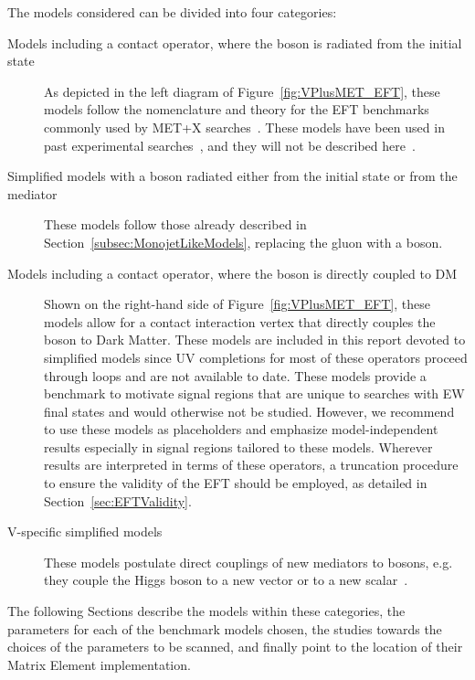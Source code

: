 %
The models considered can be divided into four categories:
\begin{description}
 \item[Models including a contact operator, where the boson is radiated from the initial state] As depicted in
 the left diagram of Figure~\ref{fig:VPlusMET_EFT}, these models follow the nomenclature and theory
 for the EFT benchmarks commonly used by MET+X searches~\cite{Goodman:2010ku}. These models
 have been used in past experimental searches~\cite{Khachatryan:2014rwa, Aad:2014vka,Khachatryan:2014tva, Aad:2014vka,
 ATLAS:2014wra, Aad:2013oja}, and they will not be described here~\cite{Cotta:2012nj, Carpenter:2012rg, Crivellin:2015wva,Berlin:2014cfa}.
 \item[Simplified models with a boson radiated either from the initial state or from the mediator] These models follow those
 already described in Section~\ref{subsec:MonojetLikeModels}, replacing the gluon with a boson.
 \item[Models including a contact operator, where the boson is directly coupled to DM]
 Shown on the right-hand side of Figure~\ref{fig:VPlusMET_EFT},
 these models allow for a contact interaction vertex that directly couples the boson to Dark Matter.
 These models are included in this report devoted to simplified models since 
 UV completions for most of these operators proceed through loops and are not available to date. 
 These models provide a benchmark to motivate signal regions that are unique to searches with
 EW final states and would otherwise not be studied. However, we recommend to use these models
 as placeholders and emphasize model-independent results especially in signal regions tailored to these models. 
 Wherever results are interpreted in terms of these operators, a truncation procedure
 to ensure the validity of the EFT should be employed, as detailed in Section~\ref{sec:EFTValidity}. 
  \item[V-specific simplified models] These models postulate direct couplings of new mediators
 to bosons, e.g. they couple the Higgs boson to a new vector or to a new scalar~\cite{Carpenter:2013xra,Berlin:2014cfa}. 
\end{description}

The following Sections describe the models within these categories,
the parameters for each of the benchmark models chosen,
the studies towards the choices of the parameters to be scanned,
and finally point to the location of their Matrix Element
implementation.

